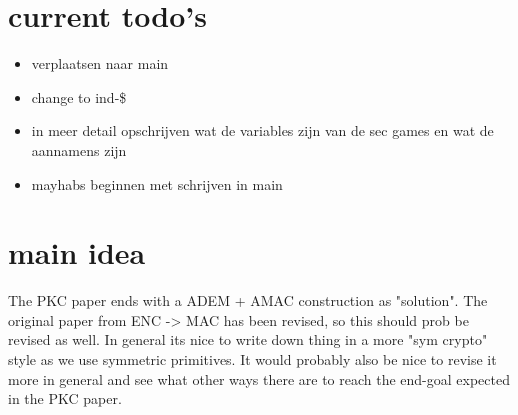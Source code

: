 \documentclass{article}
\begin{document}
\newpage
\section{current todo's}
\begin{itemize}
    \item verplaatsen naar main
    \item change to ind-\$
    \item in meer detail opschrijven wat de variables zijn van de sec games en wat de aannamens zijn
    \item mayhabs beginnen met schrijven in main
\end{itemize}

\newpage
\section{main idea}
The PKC paper ends with a ADEM + AMAC construction as "solution". The original paper from ENC -> MAC has been revised, so this should prob be revised as well. In general its nice to write down thing in a more "sym crypto" style as we use symmetric primitives. It would probably also be nice to revise it more in general and see what other ways there are to reach the end-goal expected in the PKC paper.
\end{document}
